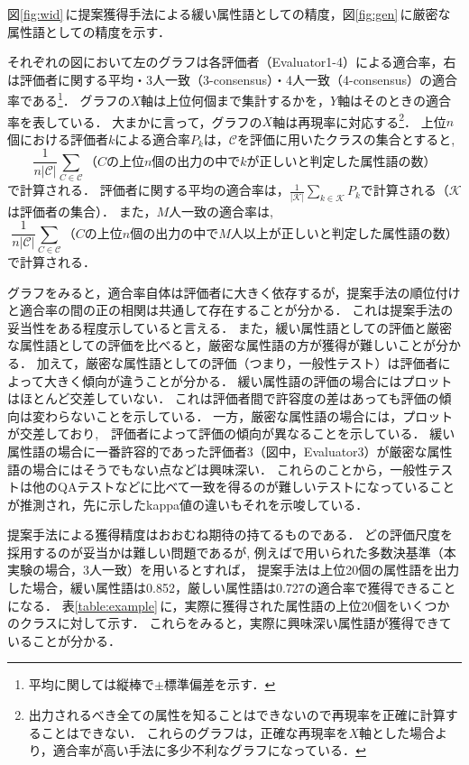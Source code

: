 図\ref{fig:wid}\,に提案獲得手法による緩い属性語としての精度，図\ref{fig:gen}\,に厳密な属性語としての精度を示す．

それぞれの図において左のグラフは各評価者（Evaluator1-4）による適合率，右は評価者に関する平均・3人一致（3-consensus）・4人一致（4-consensus）の適合率である\footnote{平均に関しては縦棒で$\pm$標準偏差を示す．}．
グラフの$X$軸は上位何個まで集計するかを，$Y$軸はそのときの適合率を表している．
大まかに言って，グラフの$X$軸は再現率に対応する\footnote{出力されるべき全ての属性を知ることはできないので再現率を正確に計算することはできない． これらのグラフは，正確な再現率を$X$軸とした場合より，適合率が高い手法に多少不利なグラフになっている．}．
上位$n$個における評価者$k$による適合率$P_k$は，$\mathcal{C}$を評価に用いたクラスの集合とすると,
\[
\frac{1}{n|\mathcal{C}|} \sum_{C \in \mathcal{C}} （\mbox{$C$の上位$n$個の出力の中で$k$が正しいと判定した属性語の数}）
\]
で計算される．
評価者に関する平均の適合率は，$\frac{1}{|\mathcal{K}|}\sum_{k \in \mathcal{K}} P_k$で計算される（$\mathcal{K}$は評価者の集合）．
また，$M$人一致の適合率は,
\[
\frac{1}{n|\mathcal{C}|} \sum_{C \in \mathcal{C}} （\mbox{$C$の上位$n$個の出力の中で$M$人以上が正しいと判定した属性語の数}）
\]
で計算される．


グラフをみると，適合率自体は評価者に大きく依存するが，提案手法の順位付けと適合率の間の正の相関は共通して存在することが分かる．
これは提案手法の妥当性をある程度示していると言える．
また，緩い属性語としての評価と厳密な属性語としての評価を比べると，厳密な属性語の方が獲得が難しいことが分かる．
加えて，厳密な属性語としての評価（つまり，一般性テスト）は評価者によって大きく傾向が違うことが分かる．
緩い属性語の評価の場合にはプロットはほとんど交差していない． これは評価者間で許容度の差はあっても評価の傾向は変わらないことを示している．
一方，厳密な属性語の場合には，プロットが交差しており,　評価者によって評価の傾向が異なることを示している．
緩い属性語の場合に一番許容的であった評価者3（図中，Evaluator3）が厳密な属性語の場合にはそうでもない点などは興味深い． 
これらのことから，一般性テストは他のQAテストなどに比べて一致を得るのが難しいテストになっていることが推測され，先に示したkappa値の違いもそれを示唆している．


提案手法による獲得精度はおおむね期待の持てるものである．
どの評価尺度を採用するのが妥当かは難しい問題であるが,
例えば\cite{Barland_ACL1999}で用いられた多数決基準（本実験の場合，3人一致）を用いるとすれば，
提案手法は上位20個の属性語を出力した場合，緩い属性語は0.852，厳しい属性語は0.727の適合率で獲得できることになる．
表\ref{table:example}\,に，実際に獲得された属性語の上位20個をいくつかのクラスに対して示す．
これらをみると，実際に興味深い属性語が獲得できていることが分かる．

